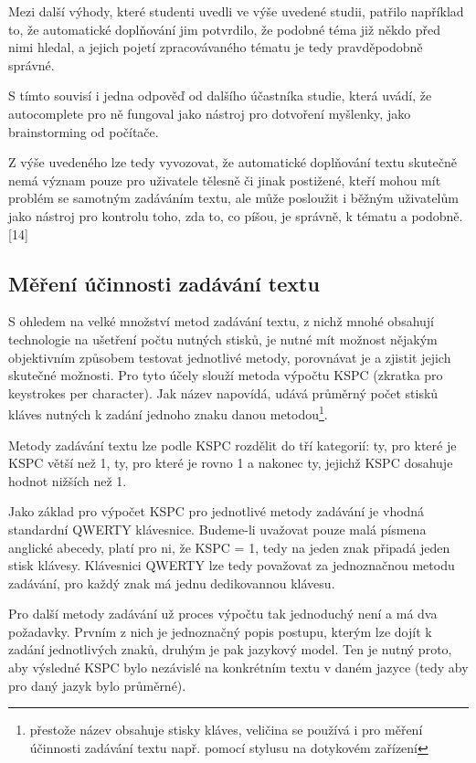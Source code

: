\documentclass{article}
\begin{document}
Mezi další výhody, které studenti uvedli ve výše uvedené studii, patřilo například to, že automatické doplňování jim potvrdilo, že podobné téma již někdo před nimi hledal, a jejich pojetí zpracovávaného tématu je tedy pravděpodobně správné. 

S tímto souvisí i jedna odpověď od dalšího účastníka studie, která uvádí, že autocomplete pro ně fungoval jako nástroj pro dotvoření myšlenky, jako brainstorming od počítače. 

Z výše uvedeného lze tedy vyvozovat, že automatické doplňování textu skutečně nemá význam pouze pro uživatele tělesně či jinak postižené, kteří mohou mít problém se samotným zadáváním textu, ale může posloužit i běžným uživatelům jako nástroj pro kontrolu toho, zda to, co píšou, je správně, k tématu a podobně. [14]

\subsection{Měření účinnosti zadávání textu}

S ohledem na velké množství metod zadávání textu, z nichž mnohé obsahují technologie na ušetření počtu nutných stisků, je nutné mít možnost nějakým objektivním způsobem testovat jednotlivé metody, porovnávat je a zjistit jejich skutečné možnosti. Pro tyto účely slouží metoda výpočtu KSPC (zkratka pro keystrokes per character). Jak název napovídá, udává průměrný počet stisků kláves nutných k zadání jednoho znaku danou metodou\footnote{přestože název obsahuje stisky kláves, veličina se používá i pro měření účinnosti zadávání textu např. pomocí stylusu na dotykovém zařízení}.

Metody zadávání textu lze podle KSPC rozdělit do tří kategorií: ty, pro které je KSPC větší než 1, ty, pro které je rovno 1 a nakonec ty, jejichž KSPC dosahuje hodnot nižších než 1.

Jako základ pro výpočet KSPC pro jednotlivé metody zadávání je vhodná standardní QWERTY klávesnice. Budeme-li uvažovat pouze malá písmena anglické abecedy, platí pro ni, že KSPC = 1, tedy na jeden znak připadá jeden stisk klávesy. Klávesnici QWERTY lze tedy považovat za jednoznačnou metodu zadávání, pro každý znak má jednu dedikovannou klávesu.

Pro další metody zadávání už proces výpočtu tak jednoduchý není a má dva požadavky. Prvním z nich je jednoznačný popis postupu, kterým lze dojít k zadání jednotlivých znaků, druhým je pak jazykový model. Ten je nutný proto, aby výsledné KSPC bylo nezávislé na konkrétním textu v daném jazyce (tedy aby pro daný jazyk bylo průměrné).
\end{document}
